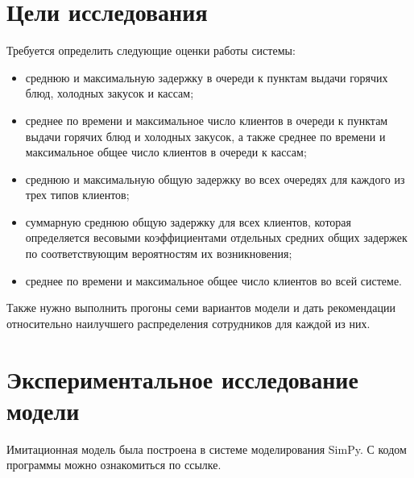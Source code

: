 \documentclass[12pt, a4paper, fleqn]{article}
\begin{document}
\section{Цели исследования}

Требуется определить следующие оценки работы системы:

\begin{itemize}
	\item среднюю и максимальную задержку в очереди к пунктам выдачи горячих блюд, холодных закусок и кассам;
	\item среднее по времени и максимальное число клиентов в очереди к пунктам выдачи горячих блюд и холодных закусок, а также среднее по времени и максимальное общее число клиентов в очереди к кассам;
	\item среднюю и максимальную общую задержку во всех очередях для каждого из трех типов клиентов;
	\item суммарную среднюю общую задержку для всех клиентов, которая определяется весовыми коэффициентами отдельных средних общих задержек по соответствующим вероятностям их возникновения;
	\item среднее по времени и максимальное общее число клиентов во всей системе. 
\end{itemize}

Также нужно выполнить прогоны семи вариантов модели и дать рекомендации относительно наилучшего распределения сотрудников для каждой из них. 

\section{Экспериментальное исследование модели}

Имитационная модель была построена в системе моделирования SimPy. С кодом программы можно ознакомиться по ссылке.
\end{document}
